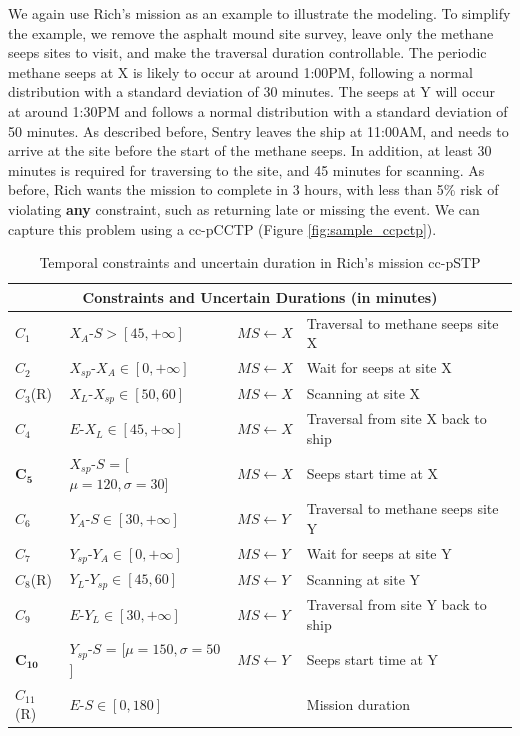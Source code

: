 \documentclass[jair,twoside,11pt,theapa]{article}
\begin{document}
We again use Rich's mission as an example to illustrate the modeling. To
simplify the example, we remove the asphalt mound site survey, leave only the methane seeps sites to visit, and make the traversal duration controllable. The
periodic methane seeps at X is likely to occur at around 1:00PM, following a normal distribution with
a standard deviation of 30 minutes. The seeps at Y will occur at around
1:30PM and follows a normal distribution with a standard deviation of 50
minutes. As described before, Sentry leaves the ship at 11:00AM, and needs to
arrive at the site before the start of the methane seeps. In addition, at least 30
minutes is required for traversing to the site, and 45 minutes for scanning. As
before, Rich wants the mission to complete in 3 hours, with less than 5\% risk
of violating \textbf{any} constraint, such as returning late or missing the event. We
can capture this problem using a cc-pCCTP (Figure \ref{fig:sample_ccpctp}).

\begin{table}[ht!]	
	\centering
	\caption{Temporal constraints and uncertain duration in Rich's mission cc-pSTP}
	\begin{tabular}{| m{1.5cm} m{4.5cm}  m{1.7cm} m{6.0cm}|}		
		\hline
		\multicolumn{4}{|c|}{\textbf{Constraints and Uncertain Durations (in minutes)}} \\		
		\hline		
		$C_{1}$ & $X_A$-$S > [45,+\infty]$ & $MS \leftarrow X$ & Traversal to methane seeps site X\\
		$C_{2}$ & $X_{sp}$-$X_A\in[0,+\infty]$ & $MS \leftarrow X$ & Wait for seeps at site X \\
		$C_{3}$(R) & $X_L$-$X_{sp}\in[50,60]$ & $MS \leftarrow X$ & Scanning at site X \\ 
		$C_{4}$ & $E$-$X_L\in[45,+\infty]$ & $MS \leftarrow X$ & Traversal from site X back to ship \\
		$\mathbf{C_{5}}$ & $X_{sp}$-$S$ = [$\mu=120,\sigma=30$] & $MS \leftarrow X$ & Seeps start time at X \\
		$C_{6}$ & $Y_A$-$S\in[30,+\infty]$ & $MS \leftarrow Y$ & Traversal to methane seeps site Y\\
		$C_{7}$ & $Y_{sp}$-$Y_A\in[0,+\infty]$ & $MS \leftarrow Y$ & Wait for seeps at site Y \\
		$C_{8}$(R) & $Y_L$-$Y_{sp}\in[45,60]$ & $MS \leftarrow Y$ & Scanning at site Y \\ 
		$C_{9}$ & $E$-$Y_L\in[30,+\infty]$ & $MS \leftarrow Y$ & Traversal from site Y back to ship \\
		$\mathbf{C_{10}}$ & $Y_{sp}$-$S$ = [$\mu=150,\sigma=50$] & $MS \leftarrow Y$ & Seeps start time at Y \\  
		$C_{11}$(R) & $E$-$S\in[0,180]$ & & Mission duration \\  
		\hline
	\end{tabular}
	\label{table:ccpctp_constraints}
\end{table}
\end{document}
